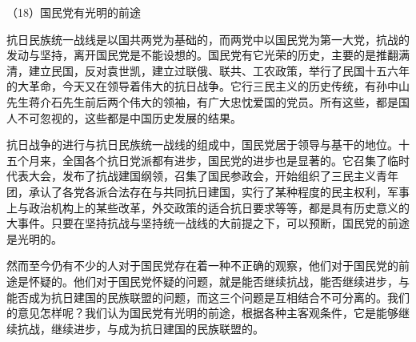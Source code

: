 \documentclass[UTF8, 12pt, a4paper]{ctexrep}
\begin{document}
（18）国民党有光明的前途

抗日民族统一战线是以国共两党为基础的，而两党中以国民党为第一大党，抗战的发动与坚持，离开国民党是不能设想的。国民党有它光荣的历史，主要的是推翻满清，建立民国，反对袁世凯，建立过联俄、联共、工农政策，举行了民国十五六年的大革命，今天又在领导着伟大的抗日战争。它行三民主义的历史传统，有孙中山先生蒋介石先生前后两个伟大的领袖，有广大忠忱爱国的党员。所有这些，都是国人不可忽视的，这些都是中国历史发展的结果。

抗日战争的进行与抗日民族统一战线的组成中，国民党居于领导与基干的地位。十五个月来，全国各个抗日党派都有进步，国民党的进步也是显著的。它召集了临时代表大会，发布了抗战建国纲领，召集了国民参政会，开始组织了三民主义青年团，承认了各党各派合法存在与共同抗日建国，实行了某种程度的民主权利，军事上与政治机构上的某些改革，外交政策的适合抗日要求等等，都是具有历史意义的大事件。只要在坚持抗战与坚持统一战线的大前提之下，可以预断，国民党的前途是光明的。

然而至今仍有不少的人对于国民党存在着一种不正确的观察，他们对于国民党的前途是怀疑的。他们对于国民党怀疑的问题，就是能否继续抗战，能否继续进步，与能否成为抗日建国的民族联盟的问题，而这三个问题是互相结合不可分离的。我们的意见怎样呢？我们认为国民党有光明的前途，根据各种主客观条件，它是能够继续抗战，继续进步，与成为抗日建国的民族联盟的。
\end{document}
